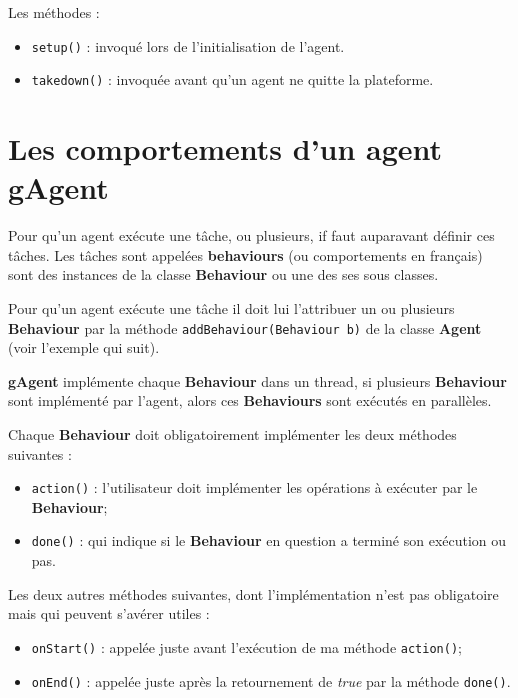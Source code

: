 Les méthodes : 

\begin{itemize}
 \item \texttt{setup()} : invoqué lors de l'initialisation de l'agent.
 \item \texttt{takedown()} :  invoquée avant qu’un agent ne quitte la plateforme.
\end{itemize}



\section{Les comportements d'un agent gAgent}

Pour qu'un agent exécute une tâche, ou plusieurs, if faut auparavant définir ces tâches. Les tâches sont appelées \textbf{behaviours} (ou comportements en français)
sont des instances de la classe \textbf{Behaviour} ou une des ses sous classes.

Pour qu'un agent exécute une tâche il doit lui l'attribuer un ou plusieurs \textbf{Behaviour} par la méthode \texttt{addBehaviour(Behaviour b)} de la classe \textbf{Agent} (voir l'exemple qui suit).

\textbf{gAgent} implémente chaque \textbf{Behaviour} dans un thread, si plusieurs \textbf{Behaviour} sont implémenté par l'agent, alors ces \textbf{Behaviours} sont exécutés en parallèles.

Chaque \textbf{Behaviour} doit obligatoirement implémenter les deux méthodes suivantes :

\begin{itemize}
 \item \texttt{action()} : l'utilisateur doit implémenter les opérations à exécuter par le \textbf{Behaviour};
 \item \texttt{done()} : qui indique si le \textbf{Behaviour} en question a terminé son exécution ou pas.
\end{itemize}


Les deux autres méthodes suivantes, dont l'implémentation n'est pas obligatoire mais qui peuvent s'avérer utiles :

\begin{itemize}
 \item \texttt{onStart()} : appelée juste avant l'exécution de ma méthode \texttt{action()};
 \item \texttt{onEnd()} : appelée juste après la retournement de \textit{true} par la méthode \texttt{done()}.
\end{itemize}

